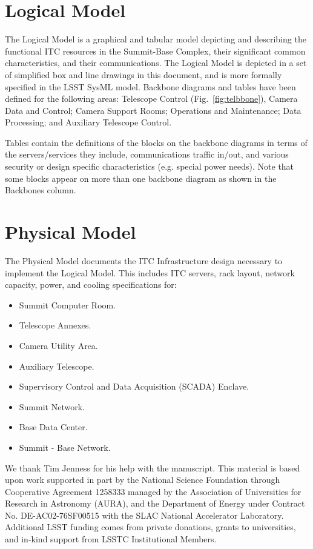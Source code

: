 \documentclass[11pt,twoside]{article}
\begin{document}
\section{Logical Model}


The Logical Model is a graphical and tabular model depicting and describing the functional ITC resources in the Summit-Base Complex, their significant common characteristics, and their communications.
The Logical Model is depicted in a set of simplified box and line drawings in this document, and is more formally specified in the LSST SysML model.
Backbone diagrams and tables have been defined for the following areas: Telescope Control (Fig.~\ref{fig:telbbone}), Camera Data and Control; Camera Support Rooms; Operations and Maintenance; Data Processing; and Auxiliary Telescope Control.

Tables contain the definitions of the blocks on the backbone diagrams in terms of the servers/services they include, communications traffic in/out, and various security or design specific characteristics (e.g. special power needs).
Note that some blocks appear on more than one backbone diagram as shown in the Backbones column.

\section{Physical Model}

The Physical Model documents the ITC Infrastructure design necessary to implement the Logical Model.
This includes ITC servers, rack layout, network capacity, power, and cooling specifications for:

\begin{itemize}
\item Summit Computer Room.
\item Telescope Annexes.
\item Camera Utility Area.
\item Auxiliary Telescope.
\item Supervisory Control and Data Acquisition (SCADA) Enclave.
\item Summit Network.
\item Base Data Center.
\item Summit - Base Network.
\end{itemize}


\acknowledgements We thank Tim Jenness for his help with the manuscript. This material is based upon work supported in part by the National Science Foundation through Cooperative Agreement 1258333 managed by the Association of Universities for Research in Astronomy (AURA), and the Department of Energy under Contract No. DE-AC02-76SF00515 with the SLAC National Accelerator Laboratory. Additional LSST funding comes from private donations, grants to universities, and in-kind support from LSSTC Institutional Members.

\end{document}
